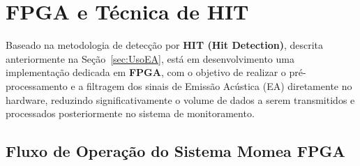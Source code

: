 %			
%			
%			

%

\section{FPGA e Técnica de HIT}

Baseado na metodologia de detecção por \textbf{HIT (Hit Detection)}, descrita anteriormente na Seção~\ref{sec:UsoEA}, está em desenvolvimento uma implementação dedicada em \textbf{FPGA}, com o objetivo de realizar o pré-processamento e a filtragem dos sinais de Emissão Acústica (EA) diretamente no hardware, reduzindo significativamente o volume de dados a serem transmitidos e processados posteriormente no sistema de monitoramento.

\subsection{Fluxo de Operação do Sistema Momea FPGA}

